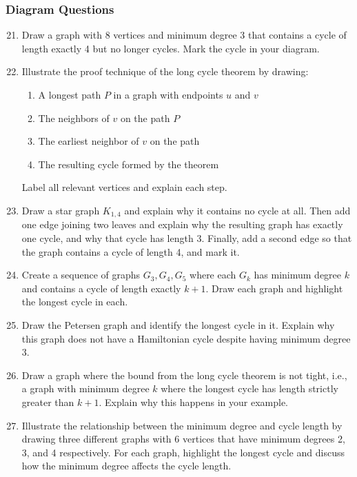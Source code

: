 \documentclass{article}
\theoremstyle{definition}
\begin{document}
\subsubsection{Diagram Questions}
\begin{enumerate}\setcounter{enumi}{20}
\item Draw a graph with 8 vertices and minimum degree 3 that contains a cycle of length exactly 4 but no longer cycles. Mark the cycle in your diagram.

\item Illustrate the proof technique of the long cycle theorem by drawing:
\begin{enumerate}
\item A longest path $P$ in a graph with endpoints $u$ and $v$
\item The neighbors of $v$ on the path $P$
\item The earliest neighbor of $v$ on the path
\item The resulting cycle formed by the theorem
\end{enumerate}
Label all relevant vertices and explain each step.

\item Draw a star graph $K_{1,4}$ and explain why it contains no cycle at all. Then add one edge joining two leaves and explain why the resulting graph has exactly one cycle, and why that cycle has length 3. Finally, add a second edge so that the graph contains a cycle of length 4, and mark it.

\item Create a sequence of graphs $G_3, G_4, G_5$ where each $G_k$ has minimum degree $k$ and contains a cycle of length exactly $k+1$. Draw each graph and highlight the longest cycle in each.

\item Draw the Petersen graph and identify the longest cycle in it. Explain why this graph does not have a Hamiltonian cycle despite having minimum degree 3.

\item Draw a graph where the bound from the long cycle theorem is not tight, i.e., a graph with minimum degree $k$ where the longest cycle has length strictly greater than $k+1$. Explain why this happens in your example.

\item Illustrate the relationship between the minimum degree and cycle length by drawing three different graphs with 6 vertices that have minimum degrees 2, 3, and 4 respectively. For each graph, highlight the longest cycle and discuss how the minimum degree affects the cycle length.
\end{enumerate}
\end{document}
